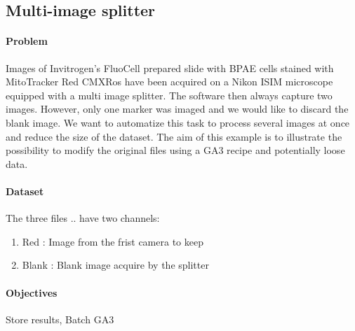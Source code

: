 \subsection{Multi-image splitter}

\paragraph{Problem}

Images of Invitrogen's FluoCell prepared slide with BPAE cells stained with MitoTracker Red CMXRos have been acquired on a Nikon ISIM microscope equipped with a multi image splitter. The software then always capture two images. However, only one marker was imaged and we would like to discard the blank image. We want to automatize this task to process several images at once and reduce the size of the dataset. The aim of this example is to illustrate the possibility to modify the original files using a GA3 recipe and potentially loose data.

\paragraph{Dataset} The three files  ..  have two channels:
    \begin{enumerate}\itemsep0em
        \item Red : Image from the frist camera to keep
        \item Blank : Blank image acquire by the splitter
    \end{enumerate}

\paragraph{Objectives} 
Store results, 
Batch GA3

